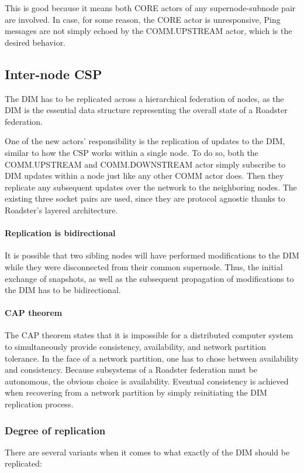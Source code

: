 This is good because it means both CORE actors of any supernode-subnode pair
are involved. In case, for some reason, the CORE actor is unresponsive, Ping
messages are not simply echoed by the COMM.UPSTREAM actor, which is the desired
behavior.


\subsection{Inter-node CSP}
The DIM has to be replicated across a hierarchical federation of nodes, as the
DIM is the essential data structure representing the overall state of a
Roadster federation.

One of the new actors' responsibility is the replication of updates to the DIM,
similar to how the \gls{CSP} works within a single node.  To do so, both the
COMM.UPSTREAM and COMM.DOWNSTREAM actor simply subscribe to DIM updates within
a node just like any other COMM actor does.  Then they replicate any subsequent
updates over the network to the neighboring nodes. The existing three socket
pairs are used, since they are protocol agnostic thanks to Roadster's layered
architecture.

\paragraph{Replication is bidirectional}
It is possible that two sibling nodes will have performed modifications to the
DIM while they were disconnected from their common supernode. Thus, the initial
exchange of snapshots, as well as the subsequent propagation of modifications
to the DIM has to be bidirectional.

\paragraph{CAP theorem}
The CAP theorem \cite{wp:cap} states that it is impossible for a distributed
computer system to simultaneously provide consistency, availability, and
network partition tolerance. In the face of a network partition, one has to
chose between availability and consistency. Because subsystems of a Roadster
federation must be autonomous, the obvious choice is availability. Eventual
consistency is achieved when recovering from a network partition by simply
reinitiating the DIM replication process.


\subsubsection{Degree of replication}
There are several variants when it comes to what exactly of the DIM should be replicated:
